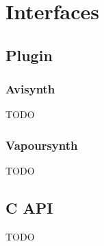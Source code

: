 \section{Interfaces}
\label{sec:interfaces}

\subsection{Plugin}
\label{sec:plugin}

\subsubsection{Avisynth}
\label{sec:avisynth}

TODO

\subsubsection{Vapoursynth}
\label{sec:vapoursynth}

TODO

\subsection{C API}
\label{sec:c-api}

TODO

